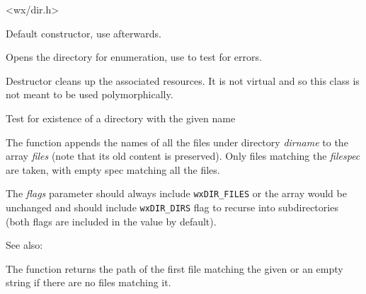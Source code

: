 
<wx/dir.h>


\label{wxdirwxdir}


Default constructor, use  afterwards.


Opens the directory for enumeration, use  
to test for errors.


\label{wxdirdtor}


Destructor cleans up the associated resources. It is not virtual and so this
class is not meant to be used polymorphically.


\label{wxdirexists}


Test for existence of a directory with the given name


\label{wxdirgetallfiles}


The function appends the names of all the files under directory {\it dirname} 
to the array {\it files} (note that its old content is preserved). Only files
matching the {\it filespec} are taken, with empty spec matching all the files.

The {\it flags} parameter should always include {\tt wxDIR\_FILES} or the array
would be unchanged and should include {\tt wxDIR\_DIRS} flag to recurse into
subdirectories (both flags are included in the value by default).

See also: 


\label{wxdirfindfirst}


The function returns the path of the first file matching the given 
or an empty string if there are no files matching it.

